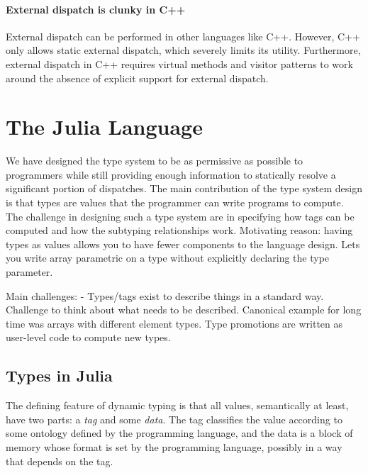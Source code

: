 \documentclass[pldi]{sigplanconf-pldi15}
\begin{document}
\paragraph{External dispatch is clunky in C++}
External dispatch can be performed in other languages like C++. However,
C++ only allows static external dispatch, which severely limits its utility.
Furthermore, external dispatch in C++ requires virtual methods and visitor
patterns\cite{designpatterns} to work around the absence of explicit support
for external dispatch.



\section{The Julia Language}

We have designed the type system to be as permissive as possible to programmers
while still providing enough information to statically resolve a significant
portion of dispatches. The main contribution of the type system design is that
types are values that the programmer can write programs to compute. The
challenge in designing such a type system are in specifying how tags can be
computed and how the subtyping relationships work.  Motivating reason: having
types as values allows you to have fewer components to the language design.
Lets you write array parametric on a type without explicitly declaring the type
parameter.

Main challenges:
- Types/tags exist to describe things in a standard way. Challenge to think
about what needs to be described. Canonical example for long time was arrays
with different element types.
Type promotions are written as user-level code to compute new types.

\subsection{Types in Julia}
The defining feature of dynamic typing is that all values, semantically at
least, have two parts: a \emph{tag} and some \emph{data}. The tag classifies
the value according to some ontology defined by the programming language, and
the data is a block of memory whose format is set by the programming language,
possibly in a way that depends on the tag.
\end{document}
